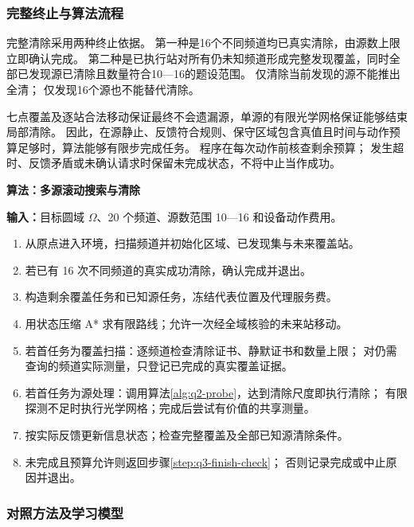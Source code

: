 \documentclass[UTF8,a4paper,zihao=5,fontset=fandol]{ctexart}
\newcounter{algorithm}
\renewcommand{\thealgorithm}{\arabic{algorithm}}
\begin{document}
\subsubsection{完整终止与算法流程}\label{sec:q3-6}

完整清除采用两种终止依据。
第一种是16个不同频道均已真实清除，由源数上限立即确认完成。
第二种是已执行站对所有仍未知频道形成完整发现覆盖，同时全部已发现源已清除且数量符合10---16的题设范围。
仅清除当前发现的源不能推出全清；
仅发现16个源也不能替代清除。

七点覆盖及逐站合法移动保证最终不会遗漏源，单源的有限光学网格保证能够结束局部清除。
因此，在源静止、反馈符合规则、保守区域包含真值且时间与动作预算足够时，算法能够有限步完成任务。
程序在每次动作前核查剩余预算；
发生超时、反馈矛盾或未确认请求时保留未完成状态，不将中止当作成功。

\par\noindent\begin{minipage}{\linewidth}
\label{alg:q3-search}
\textbf{算法\thealgorithm：多源滚动搜索与清除}

\small
\textbf{输入：}目标圆域 \(\Omega\)、20 个频道、源数范围 10---16 和设备动作费用。
\begin{enumerate}[label=\arabic*.,ref=\arabic*,leftmargin=2em,itemsep=2pt,topsep=4pt]
  \item 从原点进入环境，扫描频道并初始化区域、已发现集与未来覆盖站。
  \item\label{step:q3-finish-check} 若已有 16 次不同频道的真实成功清除，确认完成并退出。
  \item 构造剩余覆盖任务和已知源任务，冻结代表位置及代理服务费。
  \item 用状态压缩 A* 求有限路线；允许一次经全域核验的未来站移动。
  \item 若首任务为覆盖扫描：逐频道检查清除证书、静默证书和数量上限；
        对仍需查询的频道实际测量，只登记已完成的真实覆盖证据。
  \item 若首任务为源处理：调用算法\ref{alg:q2-probe}，达到清除尺度即执行清除；
        有限探测不足时执行光学网格；完成后尝试有价值的共享测量。
  \item 按实际反馈更新信息状态；检查完整覆盖及全部已知源清除条件。
  \item 未完成且预算允许则返回步骤\ref{step:q3-finish-check}；
        否则记录完成或中止原因并退出。
\end{enumerate}
\end{minipage}\par


\subsubsection{对照方法及学习模型}\label{sec:q3-7}
\end{document}
